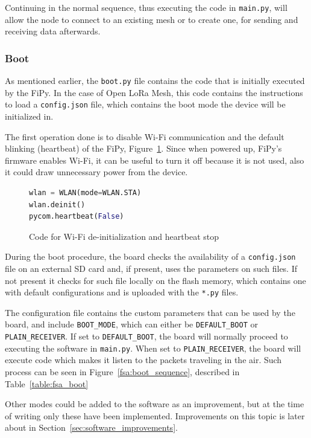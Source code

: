 				Continuing in the normal sequence, thus executing the code in \texttt{main.py}, will allow the node to connect to an existing mesh or to create one, for sending and receiving data afterwards.
				
			\subsubsection{Boot}
			
				As mentioned earlier, the \texttt{boot.py} file contains the code that is initially executed by the FiPy.
				In the case of Open LoRa Mesh, this code contains the instructions to load a \texttt{config.json} file, which contains the boot mode the device will be initialized in.
				
				The first operation done is to disable Wi-Fi communication and the default blinking (heartbeat) of the FiPy, Figure~\ref{code:boot_1}.
				Since when powered up, FiPy's firmware enables Wi-Fi, it can be useful to turn it off because it is not used, also it could draw unnecessary power from the device.

				\begin{figure}[H]
					\begin{lstlisting}[language=Python]
wlan = WLAN(mode=WLAN.STA)
wlan.deinit()
pycom.heartbeat(False)
					\end{lstlisting}
					\label{code:boot_1}
					\caption{Code for Wi-Fi de-initialization and heartbeat stop}
				\end{figure}
			
				During the boot procedure, the board checks the availability of a \texttt{config.json} file on an external SD card and, if present, uses the parameters on such files.
				If not present it checks for such file locally on the flash memory, which contains one with default configurations and is uploaded with the \texttt{*.py} files.

				The configuration file contains the custom parameters that can be used by the board, and
				include \texttt{BOOT\_MODE}, which can either be \texttt{DEFAULT\_BOOT} or \texttt{PLAIN\_RECEIVER}.
				If set to \texttt{DEFAULT\_BOOT}, the board will normally proceed to executing the software in \texttt{main.py}.
				When set to \texttt{PLAIN\_RECEIVER}, the board will execute code which makes it listen to the packets traveling in the air.
				Such process can be seen in Figure~\ref{fsa:boot_sequence}, described in Table~\ref{table:fsa_boot}
				
				Other modes could be added to the software as an improvement, but at the time of writing only these have been implemented.
				Improvements on this topic is later about in Section~\ref{sec:software_improvements}.
									
